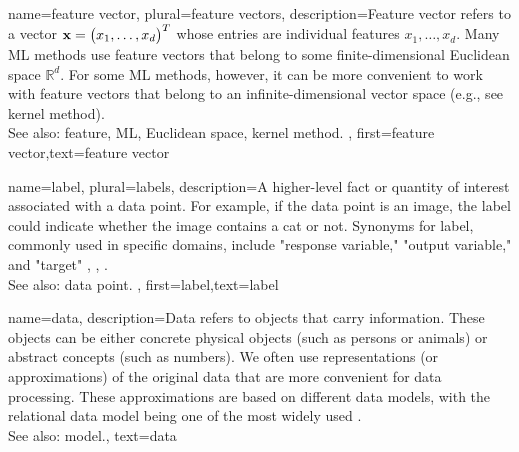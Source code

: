{name={feature vector}, plural={feature vectors},
	description={Feature vector refers to a vector ${\bf x} = \big(x_{1},\ldots,x_{d}\big)^{T}$ 
	whose entries are individual features $x_{1},\ldots,x_{d}$. Many ML methods 
	use feature vectors that belong to some finite-dimensional Euclidean space $\mathbb{R}^{d}$. 
	For some ML methods, however, it can be more convenient to work with feature 
	vectors that belong to an infinite-dimensional vector space (e.g., see kernel method). 
			\\
		See also: feature, ML, Euclidean space, kernel method.
		}, first={feature vector},text={feature vector}  
}


{name={label}, plural={labels},
	description={A higher-level fact or quantity of interest associated with a data point. 
		For example, if the data point is an image, the label could indicate whether the 
		image contains a cat or not. Synonyms for label, commonly used in specific domains, 
		include "response variable," "output variable," and "target" \cite{Gujarati2021}, \cite{Dodge2003}, \cite{Everitt2022}.
				\\
		See also: data point.
 },
	first={label},text={label}  
}


{name={data},
	 description={Data refers to objects that carry information. These 
	 	objects can be either concrete physical objects (such as persons or animals) 
	 	or abstract concepts (such as numbers). We often use representations (or 
	 	approximations) of the original data that are more convenient for data processing. 
	 	These approximations are based on different data models, with the relational data 
	 	model being one of the most widely used \cite{codd1970relational}.
				\\
		See also: model.}, 
	text={data}
}

